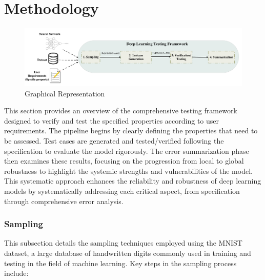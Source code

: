 \documentclass[10pt, conference, a4paper, final]{IEEEtran}
\begin{document}
\section{Methodology}
\begin{figure}{}
    \centering
    \includegraphics[width=\linewidth]{paper_images/DL framework.pdf}
    \caption{Graphical Representation}
    \label{fig:graph}
\end{figure}

This section provides an overview of the comprehensive testing framework designed to verify and test the specified properties according to user requirements. The pipeline begins by clearly defining the properties that need to be assessed. Test cases are generated and tested/verified following the specification to evaluate the model rigorously. The error summarization phase then examines these results, focusing on the progression from local to global robustness to highlight the systemic strengths and vulnerabilities of the model. This systematic approach enhances the reliability and robustness of deep learning models by systematically addressing each critical aspect, from specification through comprehensive error analysis.

\subsubsection{Sampling}
This subsection details the sampling techniques employed using the MNIST dataset, a large database of handwritten digits commonly used in training and testing in the field of machine learning. Key steps in the sampling process include:
\end{document}
